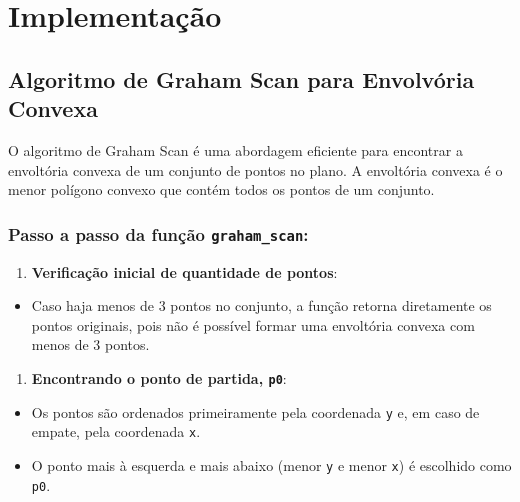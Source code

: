 \documentclass[11pt]{article}
\providecommand{\tightlist}{%
      \setlength{\itemsep}{0pt}\setlength{\parskip}{0pt}}
\begin{document}
    \hypertarget{implementauxe7uxe3o}{%
\section{Implementação}\label{implementauxe7uxe3o}}

    \hypertarget{algoritmo-de-graham-scan-para-envolvuxf3ria-convexa}{%
\subsection{Algoritmo de Graham Scan para Envolvória
Convexa}\label{algoritmo-de-graham-scan-para-envolvuxf3ria-convexa}}

O algoritmo de Graham Scan é uma abordagem eficiente para encontrar a
envoltória convexa de um conjunto de pontos no plano. A envoltória
convexa é o menor polígono convexo que contém todos os pontos de um
conjunto.

\hypertarget{passo-a-passo-da-funuxe7uxe3o-graham_scan}{%
\subsubsection{\texorpdfstring{\textbf{Passo a passo da função
\texttt{graham\_scan}:}}{Passo a passo da função graham\_scan:}}\label{passo-a-passo-da-funuxe7uxe3o-graham_scan}}

\begin{enumerate}
\def\labelenumi{\arabic{enumi}.}
\tightlist
\item
  \textbf{Verificação inicial de quantidade de pontos}:
\end{enumerate}

\begin{itemize}
\tightlist
\item
  Caso haja menos de 3 pontos no conjunto, a função retorna diretamente
  os pontos originais, pois não é possível formar uma envoltória convexa
  com menos de 3 pontos.
\end{itemize}

\begin{enumerate}
\def\labelenumi{\arabic{enumi}.}
\setcounter{enumi}{1}
\tightlist
\item
  \textbf{Encontrando o ponto de partida, \texttt{p0}}:
\end{enumerate}

\begin{itemize}
\tightlist
\item
  Os pontos são ordenados primeiramente pela coordenada \texttt{y} e, em
  caso de empate, pela coordenada \texttt{x}.
\item
  O ponto mais à esquerda e mais abaixo (menor \texttt{y} e menor
  \texttt{x}) é escolhido como \texttt{p0}.
\end{itemize}
\end{document}
